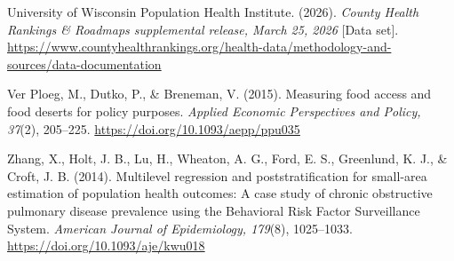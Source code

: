 \documentclass[12pt]{article}
\begin{document}
University of Wisconsin Population Health Institute. (2026). \emph{County Health Rankings \& Roadmaps supplemental release, March 25, 2026} [Data set]. \url{https://www.countyhealthrankings.org/health-data/methodology-and-sources/data-documentation}

Ver Ploeg, M., Dutko, P., \& Breneman, V. (2015). Measuring food access and food deserts for policy purposes. \emph{Applied Economic Perspectives and Policy, 37}(2), 205--225. \url{https://doi.org/10.1093/aepp/ppu035}

Zhang, X., Holt, J. B., Lu, H., Wheaton, A. G., Ford, E. S., Greenlund, K. J., \& Croft, J. B. (2014). Multilevel regression and poststratification for small-area estimation of population health outcomes: A case study of chronic obstructive pulmonary disease prevalence using the Behavioral Risk Factor Surveillance System. \emph{American Journal of Epidemiology, 179}(8), 1025--1033. \url{https://doi.org/10.1093/aje/kwu018}
\endgroup
\end{document}
